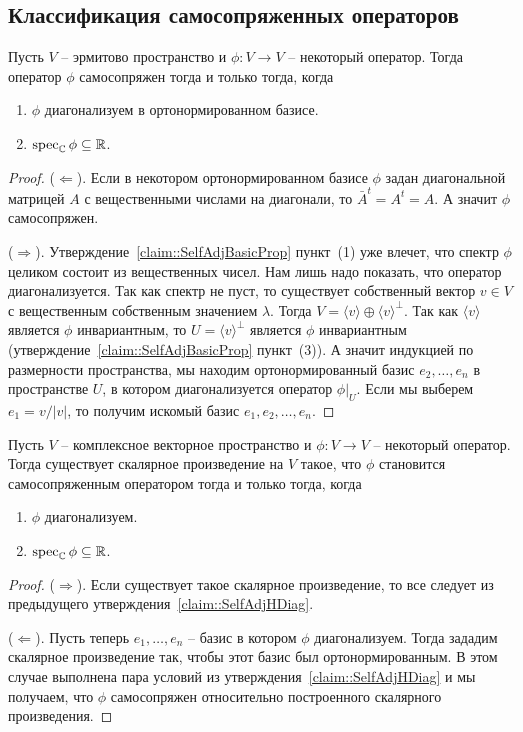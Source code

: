 \subsection{Классификация самосопряженных операторов}

\begin{claim}
\label{claim::SelfAdjHDiag}
Пусть $V$ -- эрмитово пространство и $\phi\colon V\to V$ -- некоторый оператор.
Тогда оператор $\phi$ самосопряжен тогда и только тогда, когда
\begin{enumerate}
\item $\phi$ диагонализуем в ортонормированном базисе.

\item $\operatorname{spec}_\mathbb C\phi\subseteq \mathbb R$.
\end{enumerate}
\end{claim}
\begin{proof}
($\Leftarrow$).
Если в некотором ортонормированном базисе $\phi$ задан диагональной матрицей $A$ с вещественными числами на диагонали, то $\bar A^t = A^t = A$.
А значит $\phi$ самосопряжен.

($\Rightarrow$).
Утверждение~\ref{claim::SelfAdjBasicProp} пункт~(1) уже влечет, что спектр $\phi$ целиком состоит из вещественных чисел.
Нам лишь надо показать, что оператор диагонализуется.
Так как спектр не пуст, то существует собственный вектор $v\in V$ с вещественным собственным значением $\lambda$.
Тогда $V = \langle v\rangle \oplus \langle v\rangle^\bot$.
Так как $\langle v \rangle$ является $\phi$ инвариантным, то $U = \langle v\rangle^\bot$ является $\phi$ инвариантным (утверждение~\ref{claim::SelfAdjBasicProp} пункт~(3)).
А значит индукцией по размерности пространства, мы находим ортонормированный базис $e_2,\ldots,e_n$ в пространстве $U$, в котором диагонализуется оператор $\phi|_U$.
Если мы выберем $e_1 = v / |v|$, то получим искомый базис $e_1,e_2,\ldots,e_n$.
\end{proof}

\begin{claim}
\label{claim::SelfAdjHExists}
Пусть $V$ -- комплексное векторное пространство и $\phi\colon V\to V$ -- некоторый оператор.
Тогда существует скалярное произведение на $V$ такое, что $\phi$ становится самосопряженным оператором тогда и только тогда, когда
\begin{enumerate}
\item $\phi$ диагонализуем.

\item $\operatorname{spec}_\mathbb C\phi\subseteq \mathbb R$.
\end{enumerate}
\end{claim}
\begin{proof}
($\Rightarrow$).
Если существует такое скалярное произведение, то все следует из предыдущего утверждения~\ref{claim::SelfAdjHDiag}.

($\Leftarrow$).
Пусть теперь $e_1,\ldots,e_n$ -- базис в котором $\phi$ диагонализуем.
Тогда зададим скалярное произведение так, чтобы этот базис был ортонормированным.
В этом случае выполнена пара условий из утверждения~\ref{claim::SelfAdjHDiag} и мы получаем, что $\phi$ самосопряжен относительно построенного скалярного произведения.
\end{proof}

